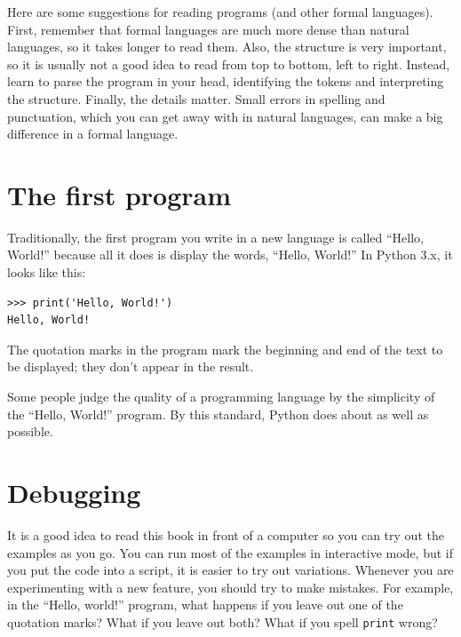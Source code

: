 Here are some suggestions for reading programs (and other formal
languages).  First, remember that formal languages are much more dense
than natural languages, so it takes longer to read them.  Also, the
structure is very important, so it is usually not a good idea to read
from top to bottom, left to right.  Instead, learn to parse the
program in your head, identifying the tokens and interpreting the
structure.  Finally, the details matter.  Small errors in
spelling and punctuation, which you can get away
with in natural languages, can make a big difference in a formal
language.

\section{The first program}
\label{hello}


Traditionally, the first program you write in a new language
is called ``Hello, World!'' because all it does is display the
words, ``Hello, World!''  In Python 3.x, it looks like this:

\beforeverb
\begin{verbatim}
>>> print('Hello, World!')
Hello, World!
\end{verbatim}
\afterverb
%

The quotation marks in the program mark the beginning and end
of the text to be displayed; they don't appear in the result.


Some people judge the quality of a programming language by the
simplicity of the ``Hello, World!'' program.  By this standard, Python
does about as well as possible.


\section{Debugging}

It is a good idea to read this book in front of a computer so you can
try out the examples as you go.  You can run most of the examples in
interactive mode, but if you put the code into a script, it is easier
to try out variations.
Whenever you are experimenting with a new feature, you should try
to make mistakes.  For example, in the ``Hello, world!'' program,
what happens if you leave out one of the quotation marks?  What
if you leave out both?  What if you spell {\tt print} wrong?


